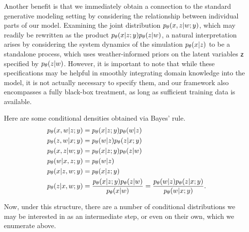 Another benefit is that we immediately obtain a connection to the standard generative modeling setting by considering the relationship between individual parts of our model. Examining the joint distribution $\pld{x,z\given w;y}$, which may readily be rewritten as the product $\pld{x\given z;y}\pld{z\given w}$, a natural interpretation arises by considering the system dynamics of the simulation $\pld{x\given z}$ to be a standalone process, which uses weather-informed priors on the latent variables $\mathsf z$ specified by $\pld{z\given w}$. However, it is important to note that while these specifications may be helpful in smoothly integrating domain knowledge into the model, it is not actually necessary to specify them, and our framework also encompasses a fully black-box treatment, as long as sufficient training data is available.

\begin{example}
    Here are some conditional densities obtained via Bayes' rule.
    \begin{align}
        \pld{x,w\given z;y} &= \pld{x\given z;y}\pld{w\given z}\\
        \pld{z,w\given x;y} &= \pld{w\given z}\pld{z\given x;y}\\
        \pld{x,z\given w;y} &= \pld{x\given z;y}\pld{z\given w}\\
        \pld{w\given x,z;y} &= \pld{w\given z} \\
        \pld{x\given z,w;y} &= \pld{x\given z;y} \\
        \pld{z\given x,w;y} &= \frac{\pld{x\given z;y}\pld{z\given w}}{\pld{x\given w}} = \frac{\pld{w\given z}\pld{z\given x;y}}{\pld{w\given x;y}}.
    \end{align}
\end{example}

Now, under this structure, there are a number of conditional distributions we may be interested in as an intermediate step, or even on their own, which we enumerate above.

